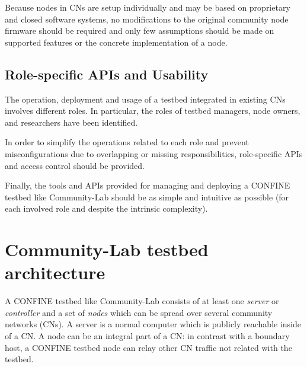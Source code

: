 \documentclass[conference]{IEEEtran}
\begin{document}
Because nodes in CNs are setup individually and may be based on
proprietary and closed software systems, no modifications to the
original community node firmware should be required and only few
assumptions should be made on supported features or the concrete
implementation of a node.


\subsection{Role-specific APIs and Usability}

The operation, deployment and usage of a testbed integrated in
existing CNs involves different roles. In particular, the roles of
testbed managers, node owners, and researchers have been identified.

In order to simplify the operations related to each role and prevent
misconfigurations due to overlapping or missing responsibilities,
role-specific APIs  and access control should be provided.

Finally, the tools and APIs provided for managing and deploying a
CONFINE testbed like Community-Lab should be as simple and intuitive as possible (for
each involved role and despite the intrinsic complexity).







\section{Community-Lab testbed architecture}
\label{sec:confine-architecture}

A CONFINE testbed like Community-Lab consists of at least one \emph{server} or \emph{controller}
and a set of \emph{nodes} which can be spread over several community networks
(CNs).  A server is a normal computer which is publicly reachable inside of a
CN.  A node can be an integral part of a CN: in contrast with a boundary host,
a CONFINE testbed node can relay other CN traffic not related with the testbed.
\end{document}
